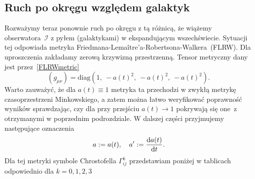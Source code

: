 \subsection{Ruch po okręgu względem galaktyk}
Rozważymy teraz ponownie ruch po okręgu z tą różnicą, że 
wiążemy obserwatora~$\mathcal{I}$ z pyłem (galaktykami) w 
ekspandującym wszechświecie. 
Sytuacji tej odpowiada metryka 
Friedmana-Lemaître’a-Robertsona-Walkera~(FLRW).
Dla uproszczenia zakładamy zerową krzywizną przestrzenną.
Tensor metryczny dany jest przez~\eqref{FLRWmetric}
\begin{equation}\label{FLRWmetric}
(g_{\mu\nu}) = \text{diag} (1,\ -a(t)^2,\ -a(t)^2,\ -a(t)^2).
\end{equation}
Warto zauważyć, że dla $a(t) \equiv 1$ metryka ta przechodzi
w zwykłą metrykę czasoprzestrzeni Minkowskiego, a zatem 
można łatwo weryfikować poprawność wyników sprawdzając, czy
dla przy przejściu $a(t)\to 1$ pokrywają się one~z otrzymanymi 
w poprzednim podrozdziale.
W dalszej części przyjmujemy następujące oznaczenia 
\begin{align}\nonumber
a:=a(t),\quad a':=\frac{\text{d} a(t)}{ \text{d} t}.
\end{align}
Dla tej metryki symbole Chrostofella $\Gamma^k _{ij}$ 
przedstawiam poniżej w tablicach odpowiednio dla $k=0,1,2,3$
